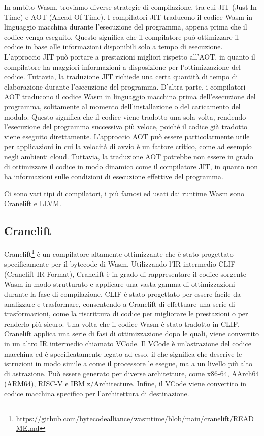 In ambito Wasm, troviamo diverse strategie di compilazione, tra cui JIT (Just In Time) e AOT (Ahead Of Time). I
compilatori JIT traducono il codice Wasm in linguaggio macchina durante l'esecuzione del programma, appena prima che il
codice venga eseguito. Questo significa che il compilatore può ottimizzare il codice in base alle informazioni
disponibili solo a tempo di esecuzione. L'approccio JIT può portare a prestazioni migliori rispetto all'AOT, in quanto
il compilatore ha maggiori informazioni a disposizione per l'ottimizzazione del codice. Tuttavia, la traduzione JIT
richiede una certa quantità di tempo di elaborazione durante l'esecuzione del programma. D'altra parte, i compilatori
AOT traducono il codice Wasm in linguaggio macchina prima dell'esecuzione del programma, solitamente al momento
dell'installazione o del caricamento del modulo. Questo significa che il codice viene tradotto una sola volta, rendendo
l'esecuzione del programma successiva più veloce, poiché il codice già tradotto viene eseguito direttamente. L'approccio
AOT può essere particolarmente utile per applicazioni in cui la velocità di avvio è un fattore critico, come ad esempio
negli ambienti cloud. Tuttavia, la traduzione AOT potrebbe non essere in grado di ottimizzare il codice in modo dinamico
come il compilatore JIT, in quanto non ha informazioni sulle condizioni di esecuzione effettive del programma.

Ci sono vari tipi di compilatori, i più famosi ed usati dai runtime Wasm sono Cranelift e LLVM.
\subsection{Cranelift}
Cranelift\footnote{\url{https://github.com/bytecodealliance/wasmtime/blob/main/cranelift/README.md}} è un compilatore
altamente ottimizzante che è stato progettato specificamente per il bytecode di Wasm. Utilizzando l'IR intermedio CLIF
(Cranelift IR Format), Cranelift è in grado di rappresentare il codice sorgente Wasm in modo strutturato e applicare una
vasta gamma di ottimizzazioni durante la fase di compilazione. CLIF è stato progettato per essere facile da analizzare e
trasformare, consentendo a Cranelift di effettuare una serie di trasformazioni, come la riscrittura di codice per
migliorare le prestazioni o per renderlo più sicuro. Una volta che il codice Wasm è stato tradotto in CLIF, Cranelift
applica una serie di fasi di ottimizzazione dopo le quali, viene convertito in un altro IR intermedio chiamato VCode. Il
VCode è un'astrazione del codice macchina ed è specificatamente legato ad esso, il che significa che descrive le
istruzioni in modo simile a come il processore le esegue, ma a un livello più alto di astrazione. Può essere generato
per diverse architetture, come x86-64, AArch64 (ARM64), RISC-V e IBM z/Architecture. Infine, il VCode viene convertito
in codice macchina specifico per l'architettura di destinazione.

